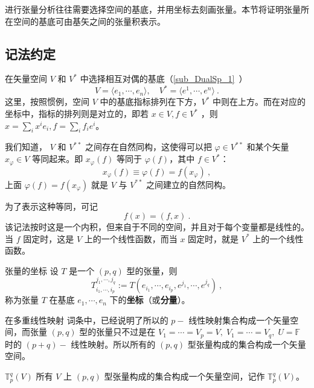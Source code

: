 
\begin{issues}
\issueDraft
\end{issues}

进行张量分析往往需要选择空间的基底，并用坐标去刻画张量。本节将证明张量所在空间的基底可由基矢之间的张量积表示。
\subsection{记法约定}
在矢量空间 $V$ 和 $V^*$ 中选择相互对偶的基底（\autoref{sub_DualSp_1}~）
\begin{equation}
V=\langle e_1,\cdots ,e_n\rangle,\quad V^*=\langle e^1,\cdots,e^n\rangle~.
\end{equation}
这里，按照惯例，空间 $V$ 中的基底指标排列在下方，$V^*$ 中则在上方。而在对应的坐标中，指标的排列则是对立的，即若 $x\in V,f\in V^*$ ，则 $x=\sum_{i}x^i e_i,f=\sum_{i}f_ie^i$。

我们知道， $V$ 和 $V^{**}$ 之间存在自然同构，这使得可以把 $\varphi\in V^{**}$ 和某个矢量 $x_{\varphi}\in V$ 等同起来。即 $x_{\varphi}(f)$ 等同于 $\varphi(f)$，其中 $f\in V^*$：
\begin{equation}
x_{\varphi}(f)\equiv\varphi(f)=f(x_{\varphi})~,
\end{equation}
上面 $\varphi(f)=f(x_{\varphi})$ 就是 $V$ 与 $V^{**}$ 之间建立的自然同构。

为了表示这种等同，可记
\begin{equation}\label{eq_CofTen_4}
f(x)=(f,x)~.
\end{equation}
该记法按时这是一个内积，但来自于不同的空间，并且对于每个变量都是线性的。当 $f$ 固定时，这是 $V$ 上的一个线性函数，而当 $x$ 固定时，就是 $V^{*}$ 上的一个线性函数。
\begin{definition}{张量的坐标}\label{def_CofTen_2}
设 $T$ 是一个 $(p,q)$ 型的张量，则
\begin{equation}
T^{j_1,\cdots,j_q}_{i_1,\cdots,i_p}:=T(e_{i_1},\cdots,e_{i_p},e^{j_1},\cdots,e^{j_q})~,
\end{equation}
称为张量 $T$ 在基底 ${e_1,\cdots,e_n}$ 下的\textbf{坐标}（或\textbf{分量}）。
\end{definition}

在多重线性映射 词条中，已经说明了所以的 $p-$ 线性映射集合构成一个矢量空间，而张量 $(p,q)$ 型的张量只不过是在 $V_1=\cdots=V_p=V,\;V_1=\cdots=V_q,\;U=\mathbb F$ 时的 $(p+q)-$ 线性映射。所以所有的 $(p,q)$ 型张量构成的集合构成一个矢量空间。
\begin{definition}{$\mathbb T^q_p(V)$}\label{def_CofTen_1}
所有 $V$ 上 $(p,q)$ 型张量构成的集合构成一个矢量空间，记作 $\mathbb T^q_p(V)$。
\end{definition} 
